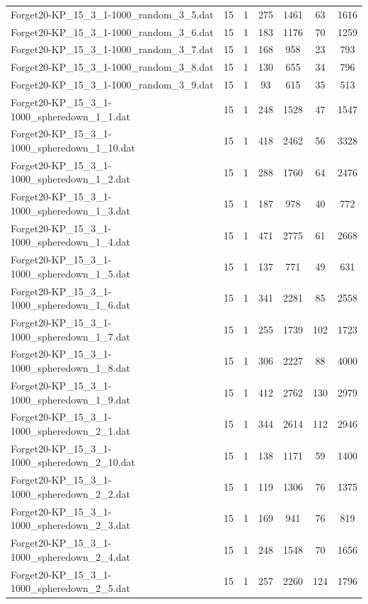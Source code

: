 \begin{table}[!ht]
\begin{tabular}{lcccccc}
Forget20-KP\_15\_3\_1-1000\_random\_3\_5.dat & 15 & 1 & 275 & 1461 & 63 & 1616 \\
Forget20-KP\_15\_3\_1-1000\_random\_3\_6.dat & 15 & 1 & 183 & 1176 & 70 & 1259 \\
Forget20-KP\_15\_3\_1-1000\_random\_3\_7.dat & 15 & 1 & 168 & 958 & 23 & 793 \\
Forget20-KP\_15\_3\_1-1000\_random\_3\_8.dat & 15 & 1 & 130 & 655 & 34 & 796 \\
Forget20-KP\_15\_3\_1-1000\_random\_3\_9.dat & 15 & 1 & 93 & 615 & 35 & 513 \\
Forget20-KP\_15\_3\_1-1000\_spheredown\_1\_1.dat & 15 & 1 & 248 & 1528 & 47 & 1547 \\
Forget20-KP\_15\_3\_1-1000\_spheredown\_1\_10.dat & 15 & 1 & 418 & 2462 & 56 & 3328 \\
Forget20-KP\_15\_3\_1-1000\_spheredown\_1\_2.dat & 15 & 1 & 288 & 1760 & 64 & 2476 \\
Forget20-KP\_15\_3\_1-1000\_spheredown\_1\_3.dat & 15 & 1 & 187 & 978 & 40 & 772 \\
Forget20-KP\_15\_3\_1-1000\_spheredown\_1\_4.dat & 15 & 1 & 471 & 2775 & 61 & 2668 \\
Forget20-KP\_15\_3\_1-1000\_spheredown\_1\_5.dat & 15 & 1 & 137 & 771 & 49 & 631 \\
Forget20-KP\_15\_3\_1-1000\_spheredown\_1\_6.dat & 15 & 1 & 341 & 2281 & 85 & 2558 \\
Forget20-KP\_15\_3\_1-1000\_spheredown\_1\_7.dat & 15 & 1 & 255 & 1739 & 102 & 1723 \\
Forget20-KP\_15\_3\_1-1000\_spheredown\_1\_8.dat & 15 & 1 & 306 & 2227 & 88 & 4000 \\
Forget20-KP\_15\_3\_1-1000\_spheredown\_1\_9.dat & 15 & 1 & 412 & 2762 & 130 & 2979 \\
Forget20-KP\_15\_3\_1-1000\_spheredown\_2\_1.dat & 15 & 1 & 344 & 2614 & 112 & 2946 \\
Forget20-KP\_15\_3\_1-1000\_spheredown\_2\_10.dat & 15 & 1 & 138 & 1171 & 59 & 1400 \\
Forget20-KP\_15\_3\_1-1000\_spheredown\_2\_2.dat & 15 & 1 & 119 & 1306 & 76 & 1375 \\
Forget20-KP\_15\_3\_1-1000\_spheredown\_2\_3.dat & 15 & 1 & 169 & 941 & 76 & 819 \\
Forget20-KP\_15\_3\_1-1000\_spheredown\_2\_4.dat & 15 & 1 & 248 & 1548 & 70 & 1656 \\
Forget20-KP\_15\_3\_1-1000\_spheredown\_2\_5.dat & 15 & 1 & 257 & 2260 & 124 & 1796 \\

\end{tabular}
\end{table}

